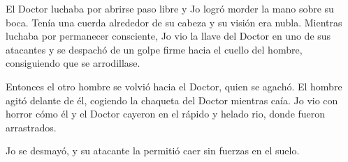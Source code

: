 El Doctor luchaba por abrirse paso libre y Jo logró morder la mano sobre
su boca. Tenía una cuerda alrededor de su cabeza y su visión era nubla.
Mientras luchaba por permanecer consciente, Jo vio la llave del Doctor
en uno de sus atacantes y se despachó de un golpe firme hacia el cuello
del hombre, consiguiendo que se arrodillase.

Entonces el otro hombre se volvió hacia el Doctor, quien se agachó. El
hombre agitó delante de él, cogiendo la chaqueta del Doctor mientras
caía. Jo vio con horror cómo él y el Doctor cayeron en el rápido y
helado rio, donde fueron arrastrados.

Jo se desmayó, y su atacante la permitió caer sin fuerzas en el suelo.